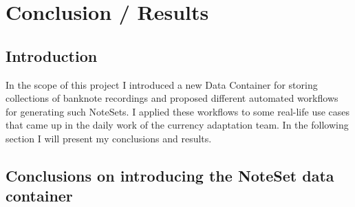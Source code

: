 \chapter{ Conclusion / Results}
\label{chap:conclusions}

\section{Introduction}
In the scope of this project I introduced a new Data Container for storing collections of banknote recordings and proposed different automated workflows for generating such NoteSets. I applied these workflows to some real-life use cases that came up in the daily work of the currency adaptation team. In the following section I will present my conclusions and results.

\section{Conclusions on introducing the NoteSet data container}

